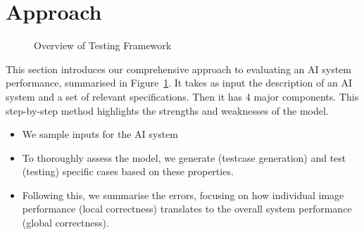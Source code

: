 \documentclass[10pt, conference, a4paper, final]{IEEEtran}
\begin{document}
\section{Approach}
\begin{figure}{}
    \centering

    \caption{Overview of Testing Framework}
    \label{fig:graph}
\end{figure}

This section introduces our comprehensive approach to evaluating an AI system performance, summarised in Figure~\ref{fig:graph}. It takes as input the description of an AI system and a set of relevant specifications. Then it has 4 major components. This step-by-step method highlights the strengths and weaknesses of the model.
\begin{itemize}

\item We sample inputs for the AI system
\item To thoroughly assess the model, we generate (testcase generation) and test (testing) specific cases based on these properties.
  
\item Following this, we summarise the errors, focusing on how individual image performance (local correctness) translates to the overall system performance (global correctness). 
\end{itemize}
\end{document}

